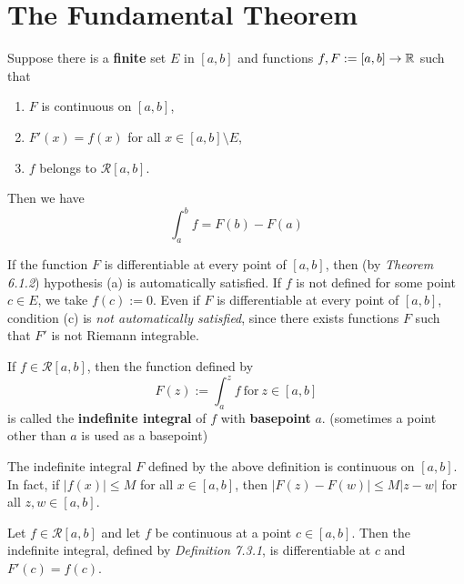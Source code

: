 \section{The Fundamental Theorem}

\begin{theorem}
	Suppose there is a \textbf{finite} set $E$ in $[a,b]$ and functions $f,F:=[a,b] \to \mathbb{R}$ such that
	\begin{enumerate}
		\item $F$ is continuous on $[a,b]$,

		\item $F'(x)=f(x)$ for all $x \in [a,b]\setminus E$,

		\item $f$ belongs to $\mathcal{R}[a,b]$.
	\end{enumerate}
	Then we have
	\[\displaystyle\int_{a}^{b}f=F(b)-F(a)\]
\end{theorem}

\begin{remark}
	If the function $F$ is differentiable at every point of $[a,b]$, then (by \textit{Theorem 6.1.2}) hypothesis (a) is automatically satisfied. If $f$ is not defined for some point $c \in E$, we take $f(c):=0$. Even if $F$ is differentiable at every point of $[a,b]$, condition (c) is \textit{not automatically satisfied}, since there exists functions $F$ such that $F'$ is not Riemann integrable.
\end{remark}

\begin{definition}
	If $f \in \mathcal{R}[a,b]$, then the function defined by
	\[F(z):=\displaystyle\int_{a}^{z}f\ \text{for}\ z \in [a,b]\]
	is called the \textbf{indefinite integral} of $f$ with \textbf{basepoint} $a$. (sometimes a point other than $a$ is used as a basepoint)
\end{definition}

\begin{theorem}
	The indefinite integral $F$ defined by the above definition is continuous on $[a,b]$. In fact, if $|f(x)|\leq M$ for all $ x \in [a,b]$, then $|F(z)-F(w)|\leq M|z-w|$ for all $z,w \in [a,b]$.
\end{theorem}

\begin{theorem}
	Let $f \in \mathcal{R}[a,b]$ and let $f$ be continuous at a point $c \in [a,b]$. Then the indefinite integral, defined by \textit{Definition 7.3.1}, is differentiable at $c$ and $F'(c)=f(c)$.
\end{theorem}

